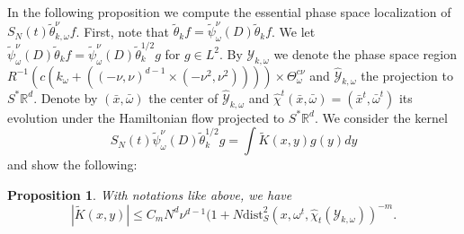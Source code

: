\documentclass{amsart}
\numberwithin{equation}{section}
\newtheorem{proposition}[theorem]{Proposition}
\theoremstyle{definition}
\newcommand{\R}{\mathbb{R}}
\begin{document}
In the following proposition we compute the essential phase space localization of $S_N(t) \tilde{\theta}_{k,\omega}^{\nu} f$. First, note that $\tilde{\theta}_k f = \tilde{\psi}^{\nu}_{\omega}(D) \tilde{\theta}_k f$.
We let $\tilde{\psi}^{\nu}_{\omega}(D) \tilde{\theta}_k f = \tilde{\psi}^{\nu}_{\omega}(D) \tilde{\theta}_k^{1/2} g$ for $g \in L^2$. By $\mathcal{Y}_{k,\omega}$ we denote the phase space region $R^{-1} (c(k_\omega + ((-\nu,\nu)^{d-1} \times (-\nu^2,\nu^2)))) \times \Theta_\omega^{c \nu}$ and $\hat{\mathcal{Y}}_{k,\omega}$ the projection to $S^* \R^d$. Denote by $(\bar{x},\bar{\omega})$ the center of $\hat{\mathcal{Y}}_{k,\omega}$ and $\hat{\chi}^t(\bar{x},\bar{\omega}) = (\bar{x}^t,\bar{\omega}^t)$ its evolution under the Hamiltonian flow projected to $S^* \R^d$. 
We consider the kernel 
\begin{equation*}
S_N(t) \tilde{\psi}^{\nu}_{\omega}(D) \tilde{\theta}_k^{1/2} g = \int \tilde{K}(x,y) g(y) dy
\end{equation*}
and show the following:
\begin{proposition}
\label{prop:PhaseSpaceLocalization}
With notations like above, we have
\begin{equation*}
| \tilde{K}(x,y) | \leq C_m N^{d} \nu^{d-1} (1+ N \text{dist}_S^2(x,\omega^t,\hat{\chi}_t(\mathcal{Y}_{k,\omega}) )^{-m}.
\end{equation*}
\end{proposition}
\end{document}
